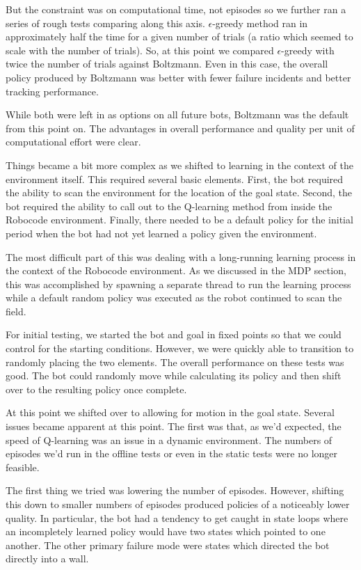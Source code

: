 \documentclass{aiaa-tc}%
\begin{document}
But the constraint was on computational time, not episodes so we
further ran a series of rough tests comparing along this axis. $\epsilon$-greedy method ran in approximately half the
time for a given number of trials (a ratio which seemed to scale with
the number of trials). So, at this point we compared $\epsilon$-greedy
with twice the number of trials against Boltzmann. Even in this case,
the overall policy produced by Boltzmann was better with fewer failure
incidents and better tracking performance.

While both were left in as options on all future
bots, Boltzmann was the default from this point on. The advantages in
overall performance and quality per unit of computational effort were clear.

Things became a bit more complex as we shifted to
learning in the context of the environment itself. This required
several basic elements. First, the bot required the ability to scan
the environment for the location of the goal state. Second, the bot
required the ability to call out to the Q-learning method from inside
the Robocode environment. Finally, there needed to be a default policy
for the initial period when the bot had not yet learned a policy given
the environment. 

The most difficult part of this was dealing with a long-running
learning process in the context of the Robocode environment. As we
discussed in the MDP section, this was accomplished by spawning a
separate thread to run the learning process while a default random
policy was executed as the robot continued to scan the field.

For initial testing, we started the bot and goal in fixed points so
that we could control for the starting conditions. However, we were
quickly able to transition to randomly placing the two elements. The overall
performance on these tests was good. The bot could randomly move while
calculating its policy and then shift over to the resulting policy once complete.

At this point we shifted over to allowing for motion in the goal
state. Several issues became apparent at this point. The first was that, as we'd expected, the
speed of Q-learning was an issue in a dynamic environment. The numbers
of episodes we'd run in the offline tests or even in the
static tests were no
longer feasible. 

The first thing we tried was lowering the number of episodes. 
However, shifting this down to smaller numbers of episodes produced policies of a noticeably lower quality. In
particular, the bot had a tendency to get caught in state loops where
an incompletely learned policy would have two states which pointed to
one another. The other primary failure mode were states which directed
the bot directly into a wall.
\end{document}
